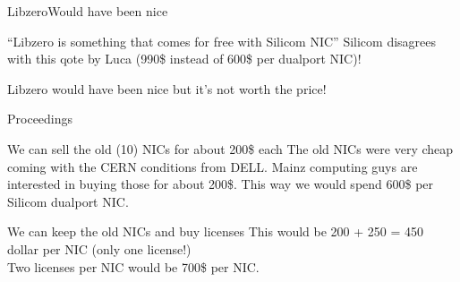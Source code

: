 \begin{frame}{Libzero}{Would have been nice}
	\begin{block}{``Libzero is something that comes for free with Silicom NIC''}
		 Silicom disagrees with this qote by Luca (990\$ instead of 600\$ per
		 dualport NIC)!
	\end{block}
	\begin{ergo}
		Libzero would have been nice but it's not worth the price!
	\end{ergo}
\end{frame}

\begin{frame}{Proceedings}{}
	\begin{block}{We can sell the old (10) NICs for about 200\$ each}
		The old NICs were very cheap coming with the CERN conditions from DELL. Mainz
		computing guys are interested in buying those for about 200\$. This way we
		would spend 600\$ per Silicom dualport NIC.
	\end{block}
	
	\begin{block}{We can keep the old NICs and buy licenses}
		This would be 200 + 250 = 450 dollar per NIC (only one license!)
		\\
		Two licenses per NIC would be 700\$ per NIC.
	\end{block}
	
	
\end{frame}